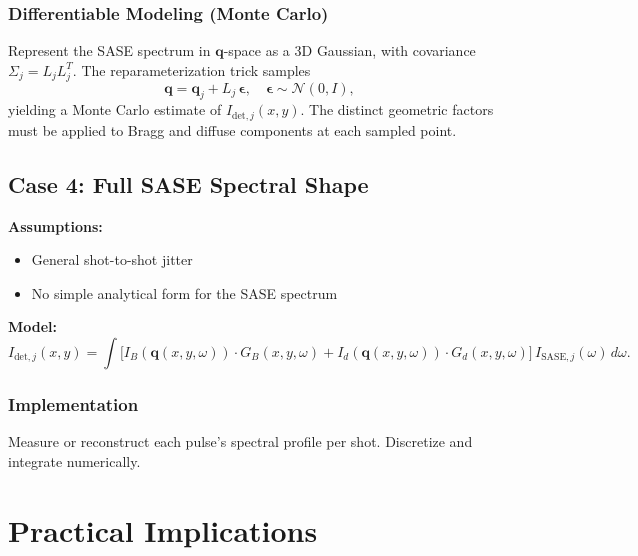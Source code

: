 \documentclass[12pt,a4paper]{article}
\begin{document}
\subsubsection*{Differentiable Modeling (Monte Carlo)}
Represent the SASE spectrum in $\mathbf{q}$-space as a 3D Gaussian, with covariance $\Sigma_j = L_j L_j^{T}$. The reparameterization trick samples
\[
\mathbf{q} = \mathbf{q}_j + L_j\,\boldsymbol{\epsilon}, \quad \boldsymbol{\epsilon} \sim \mathcal{N}(0,I),
\]
yielding a Monte Carlo estimate of $I_{\text{det},j}(x,y)$. The distinct geometric factors must be applied to Bragg and diffuse components at each sampled point.

\subsection{Case 4: Full SASE Spectral Shape}
\textbf{Assumptions:}
\begin{itemize}
\item General shot-to-shot jitter
\item No simple analytical form for the SASE spectrum
\end{itemize}
\textbf{Model:}
\begin{equation}
I_{\text{det},j}(x,y) = \int \bigl[I_B(\mathbf{q}(x,y,\omega)) \cdot G_B(x,y,\omega) + I_d(\mathbf{q}(x,y,\omega)) \cdot G_d(x,y,\omega)\bigr]\,
I_{\text{SASE},j}(\omega)\,d\omega.
\end{equation}

\subsubsection*{Implementation}
Measure or reconstruct each pulse's spectral profile per shot. Discretize and integrate numerically.

\section{Practical Implications}
\end{document}
